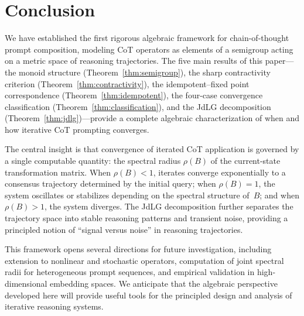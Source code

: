 \section{Conclusion}\label{sec:conclusion}

We have established the first rigorous algebraic framework for chain-of-thought
prompt composition, modeling CoT operators as elements of a semigroup acting on
a metric space of reasoning trajectories. The five main results of this
paper---the monoid structure (Theorem~\ref{thm:semigroup}), the sharp
contractivity criterion (Theorem~\ref{thm:contractivity}), the
idempotent--fixed point correspondence (Theorem~\ref{thm:idempotent}), the
four-case convergence classification (Theorem~\ref{thm:classification}), and
the JdLG decomposition (Theorem~\ref{thm:jdlg})---provide a complete algebraic
characterization of when and how iterative CoT prompting converges.

The central insight is that convergence of iterated CoT application is governed
by a single computable quantity: the spectral radius $\rho(B)$ of the
current-state transformation matrix. When $\rho(B)<1$, iterates converge
exponentially to a consensus trajectory determined by the initial query; when
$\rho(B)=1$, the system oscillates or stabilizes depending on the spectral
structure of~$B$; and when $\rho(B)>1$, the system diverges. The JdLG
decomposition further separates the trajectory space into stable reasoning
patterns and transient noise, providing a principled notion of
``signal versus noise'' in reasoning trajectories.

This framework opens several directions for future investigation, including
extension to nonlinear and stochastic operators, computation of joint spectral
radii for heterogeneous prompt sequences, and empirical validation in
high-dimensional embedding spaces. We anticipate that the algebraic perspective
developed here will provide useful tools for the principled design and analysis
of iterative reasoning systems.
